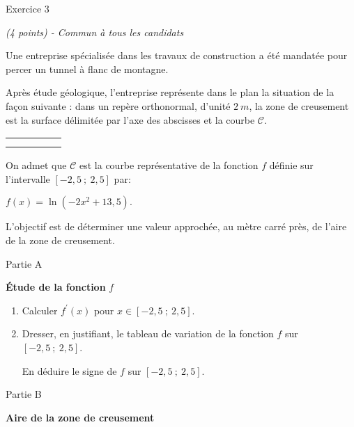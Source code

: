 
%
\begin{h2}Exercice 3\end{h2}
\textit{(4 points) - Commun à tous les candidats}
\par
Une entreprise spécialisée dans les travaux de construction a été mandatée pour percer un tunnel à flanc de montagne.
\par
Après étude géologique, l'entreprise représente dans le plan la situation de la façon suivante : dans un repère orthonormal, d'unité $2~m$, la zone de creusement est la surface délimitée par l'axe des abscisses et la courbe $\mathscr{C}$.

\begin{center}
\end{center}
\begin{tabularx}{0.8\linewidth}{|*{3}{>{\centering \arraybackslash }X|}}%
 &   &  &   &   &  
     \\ \hline
     &    &    &    &    &  
     \\ \hline
     &   &   &   &  & 
     \\ \hline
\end{tabularx}
On admet que $\mathscr{C}$ est la courbe représentative de la fonction $f$ définie sur l'intervalle $[- 2,5~;~2,5]$ par:
\begin{center}$f(x) = \ln \left(- 2x^2+13,5\right).$\end{center}
L'objectif est de déterminer une valeur approchée, au mètre carré près, de l'aire de la zone de creusement.
\begin{h3}Partie A\end{h3}
\textbf{Étude de la fonction }  $f$
\begin{enumerate}
     \item
     Calculer $f^\prime(x)$ pour $x \in  [- 2,5~;~2,5]$.
     \item
     Dresser, en justifiant, le tableau de variation de la fonction $f$ sur $[- 2,5~;~2,5]$.
     \par
     En déduire le signe de $f$ sur $[- 2,5~;~2,5]$.
\end{enumerate}
\begin{h3}Partie B\end{h3}
\textbf{Aire de la zone de creusement}
